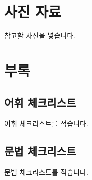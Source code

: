 \documentclass{snu-fl-questionnaire}
\begin{document}
\chapter{사진 자료}
참고할 사진을 넣습니다.


\chapter*{부록}
\begin{appendices}

\section{어휘 체크리스트}
어휘 체크리스트를 적습니다.


\section{문법 체크리스트}
문법 체크리스트를 적습니다.

\end{appendices}


\backmatter
\makebackcover
\end{document}
